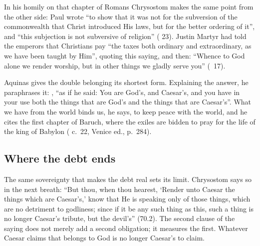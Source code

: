 In his homily on that chapter of Romans Chrysostom makes the same point from
the other side:
Paul wrote ``to show that it was not for the subversion of the commonwealth
that Christ introduced His laws, but for the better ordering of it'', and
``this subjection is not subversive of religion'' (
23). Justin Martyr had told the emperors that
Christians pay ``the taxes both ordinary and extraordinary, as we have been
taught by Him'', quoting this saying, and then: ``Whence to God alone we
render worship, but in other things we gladly serve you'' (~17).

Aquinas gives the double belonging its shortest form. Explaining the answer,
he paraphrases it: , ``as if he said: You are
God's, and Caesar's, and you have in your use both the things that are God's
and the things that are Caesar's''. What we have from the world binds us, he
says, to keep peace with the world, and he cites the first chapter of Baruch,
where the exiles are bidden to pray for the life of the king of Babylon
( c.~22, Venice ed., p.~284).

\subsection{Where the debt ends}

The same sovereignty that makes the debt real sets its limit. Chrysostom says
so in the next breath: ``But thou, when thou hearest, `Render unto Caesar the
things which are Caesar's,' know that He is speaking only of those things,
which are no detriment to godliness; since if it be any such thing as this,
such a thing is no longer Caesar's tribute, but the devil's'' (70.2). The
second clause of the saying does not merely add a second obligation; it
measures the first. Whatever Caesar claims that belongs to God is no longer
Caesar's to claim.

